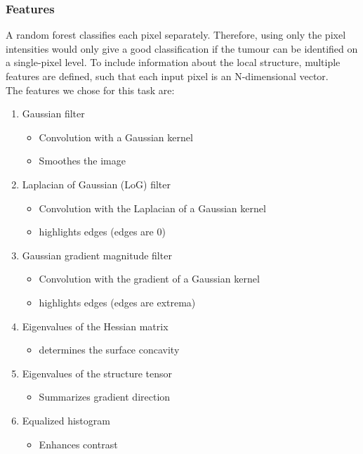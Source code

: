 \documentclass[final]{article}
\begin{document}
\subsubsection{Features} \label{sec:features}
A random forest classifies each pixel separately. Therefore, using only the
pixel intensities would only give a good classification if the tumour can be
identified on a single-pixel level. To include information about the local
structure, multiple features are defined, such that each input pixel is an
N-dimensional vector.\\ The features we chose for this task are:
\begin{enumerate}
\item Gaussian filter
\begin{itemize}
\item Convolution with a Gaussian kernel
\item Smoothes the image
\end{itemize}
\item Laplacian of Gaussian (LoG) filter
\begin{itemize}
\item Convolution with the Laplacian of a Gaussian kernel
\item highlights edges (edges are 0)
\end{itemize}
\item Gaussian gradient magnitude filter
\begin{itemize}
\item Convolution with the gradient of a Gaussian kernel
\item highlights edges (edges are extrema)
\end{itemize}
\item Eigenvalues of the Hessian matrix
\begin{itemize}
\item determines the surface concavity
\end{itemize}
\item Eigenvalues of the structure tensor
\begin{itemize}
\item Summarizes gradient direction
\end{itemize}
\item Equalized histogram
\begin{itemize}
\item Enhances contrast
\end{itemize}
\end{enumerate}
\end{document}
